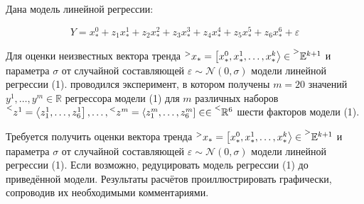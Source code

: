 \begin{singlespace}
\vspace{3em}

\parbox{\textwidth}{
}

\vspace{3em}

\parbox{\textwidth}{
}

\vspace{7em}

\parbox{\textwidth}{
}

\end{singlespace}

\newpage

\doublespacing

\section*{}

Дана модель линейной регрессии:

\begin{equation}
	Y = x^0_* + z_1x^1_* + z_2x^2_* + z_3x^3_* + z_4x^4_* + z_5x^5_* + z_6x^6_* + \varepsilon
\end{equation}

Для оценки неизвестных вектора тренда 
$\prescript{>}{}{x_*} = \left[ x^0_*, x^1_*, \dots, x^k_* \right> \in \prescript{>}{}{\mathbb{E}^{k+1}}$
и параметра $\sigma$ от случайной составляющей $\varepsilon \sim \mathcal{N}(0, \sigma)$ модели линейной регрессии (1). 
проводился эксперимент, в котором получены $m = 20$ значений $y^1, \dots, y^m \in \mathbb{R}$
регрессора модели (1) для $m$ различных наборов 
$\prescript{<}{}{z^1} = \left< z^1_1, \dots,  z^1_6\right], \dots, \prescript{<}{}{z^m} = \left< z^m_1, \dots,  z^m_6\right] 
\in \in \prescript{<}{}{\mathbb{R}^{6}}$ шести факторов модели (1).

Требуется получить оценки вектора тренда
$\prescript{>}{}{x_*} = \left[ x^0_*, x^1_*, \dots, x^k_* \right> \in \prescript{>}{}{\mathbb{E}^{k+1}}$
и параметра $\sigma$ от случайной составляющей $\varepsilon \sim \mathcal{N}(0, \sigma)$ модели линейной регрессии (1). 
Если возможно, редуцировать модель регрессии (1) до приведённой модели. 
Результаты расчётов проиллюстрировать графически, сопроводив их необходимыми комментариями.

\parbox{\textwidth}{
}

